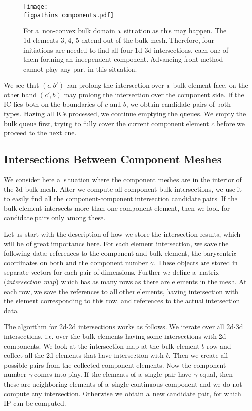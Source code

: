\begin{figure}[!htb]
    \centering
    \texttt{[image: \\figpathins components.pdf]}
    \caption[Components in non-convex bulk domain.]
    {For a~non-convex bulk domain a~situation as this may happen. The 1d elements 3, 4, 5 extend out of the bulk mesh.
    Therefore, four initiations are needed to find all four 1d-3d intersections, each one of them forming an independent component. 
    Advancing front method cannot play any part in this situation.}
    \label{fig:components}
\end{figure}

We see that $(c, b')$ can prolong the intersection over a~bulk element face, on the other hand $(c', b)$ 
may prolong the intersection over the component side. If the IC lies both on the boundaries of $c$ and $b$,
we obtain candidate pairs of both types. Having all ICs processed, we continue emptying the queues. We empty the bulk queue first,
trying to fully cover the current component element $c$ before we proceed to the next one. 

\subsection{Intersections Between Component Meshes}
\label{sec:components}
We consider here a~situation where the component meshes are in the interior of the 3d bulk mesh. After we compute
all component-bulk intersections, we use it to easily find all the component-component intersection candidate
pairs.
If the bulk element intersects more than one component element, then we look for candidate pairs only among these.

Let us start with the description of how we store the intersection results, which will be of great importance here.
For each element intersection, we save the following data: references to the component and bulk element, 
the barycentric coordinates on both and the component number $\gamma$. These objects are stored in separate vectors for each pair of dimensions.
Further we define a~matrix (\emph{intersection map}) which has as many rows as there are elements in the mesh.
At each row, we save the references to all other elements, having intersection with the element corresponding to this row, and references to the actual intersection data.

The algorithm for 2d-2d intersections works as follows. We iterate over all 2d-3d intersections, i.e. over
the bulk elements having some intersections with 2d components. We look at the intersection map at the
bulk element $b$ row and collect all the 2d elements that have intersection with $b$.
Then we create all possible pairs from the collected component elements.
Now the component number $\gamma$ comes into play. If the elements of a~single pair have $\gamma$ equal, then 
these are neighboring elements of a~single continuous component and we do not compute any intersection.
Otherwise we obtain a~new candidate pair, for which IP can be computed.

